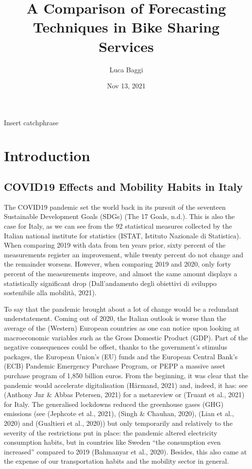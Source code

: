 \documentclass[letterpaper,10pt,english]{jupyterBook}
\title{A Comparison of Forecasting Techniques in Bike Sharing Services}
\date{Nov 13, 2021}
\author{Luca Baggi}
\begin{document}
\pagestyle{empty}
\sphinxmaketitle
\pagestyle{plain}
\sphinxtableofcontents
\pagestyle{normal}
\label{\detokenize{frontmatter::doc}}


\sphinxAtStartPar
Insert catchphrase


\chapter{Introduction}
\label{\detokenize{01-introduction:introduction}}\label{\detokenize{01-introduction::doc}}

\section{COVID\sphinxhyphen{}19 Effects and Mobility Habits in Italy}
\label{\detokenize{01-introduction:covid-19-effects-and-mobility-habits-in-italy}}
\sphinxAtStartPar
The COVID\sphinxhyphen{}19 pandemic set the world back in its pursuit of the seventeen Sustainable Development Goals (SDGs) (The 17 Goals, n.d.). This is also the case for Italy, as we can see from the 92 statistical measures collected by the Italian national institute for statistics (ISTAT, Istituto Nazionale di Statistica). When comparing 2019 with data from ten years prior, sixty percent of the measurements register an improvement, while twenty percent do not change and the remainder worsens. However, when comparing 2019 and 2020, only forty percent of the measurements improve, and almost the same amount displays a statistically significant drop (Dall’andamento degli obiettivi di sviluppo sostenibile alla mobilità, 2021).

\sphinxAtStartPar
To say that the pandemic brought about a lot of change would be a redundant understatement. Coming out of 2020, the Italian outlook is worse than the average of the (Western) European countries \sphinxhyphen{} as one can notice upon looking at macroeconomic variables such as the Gross Domestic Product (GDP). Part of the negative consequences could be offset, thanks to the government’s stimulus packages, the European Union’s (EU) funds and the European Central Bank’s (ECB) Pandemic Emergency Purchase Program, or PEPP \sphinxhyphen{} a massive asset purchase program of 1,850 billion euros. From the beginning, it was clear that the pandemic would accelerate digitalisation (Härmand, 2021) \sphinxhyphen{} and, indeed, it has: see (Anthony Jnr \& Abbas Petersen, 2021) for a meta\sphinxhyphen{}review or (Truant et al., 2021) for Italy. The generalised lockdowns reduced the greenhouse gases (GHG) emissions (see (Jephcote et al., 2021), (Singh \& Chauhan, 2020), (Lian et al., 2020) and (Gualtieri et al., 2020)) but only temporarily and relatively to the severity of the restrictions put in place: the pandemic altered electricity consumption habits, but in countries like Sweden “the consumption even increased” compared to 2019 (Bahmanyar et al., 2020). Besides, this also came at the expense of our transportation habits and the mobility sector in general.
\end{document}
